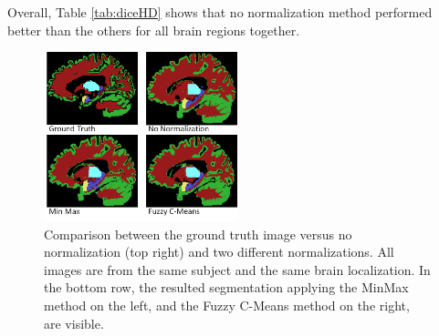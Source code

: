 \documentclass[article]{IEEEtran}
\begin{document}
	Overall, Table \ref{tab:diceHD} shows that no normalization method performed better than the others for all brain regions together. 
	\begin{figure}[h]
		\centering
		\includegraphics[width=0.5\textwidth]{compNorms.png}
		\caption{Comparison between the ground truth image versus no normalization (top right) and two different normalizations. All images are from the same subject and the same brain localization. In the bottom row, the resulted segmentation applying the MinMax method on the left, and the Fuzzy C-Means method on the right, are visible. }
		\label{fig:e2}
	\end{figure}
\end{document}

